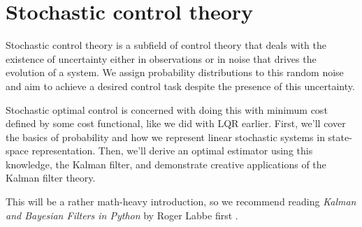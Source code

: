 
\chapter{Stochastic control theory}
\label{ch:stochastic_control_theory}

Stochastic control theory is a subfield of control theory that deals with the
existence of uncertainty either in observations or in noise that drives the
evolution of a \gls{system}. We assign probability distributions to this random
noise and aim to achieve a desired control task despite the presence of this
uncertainty.

Stochastic optimal control is concerned with doing this with minimum cost
defined by some cost functional, like we did with LQR earlier. First, we'll
cover the basics of probability and how we represent linear stochastic
\glspl{system} in state-space representation. Then, we'll derive an optimal
estimator using this knowledge, the Kalman filter, and demonstrate creative
applications of the Kalman filter theory.

This will be a rather math-heavy introduction, so we recommend reading
\textit{Kalman and Bayesian Filters in Python} by Roger Labbe first
\cite{bib:kalman_and_bayesian_filters_in_python}.

\renewcommand*{\chapterpath}{\partpath/stochastic-control-theory}










